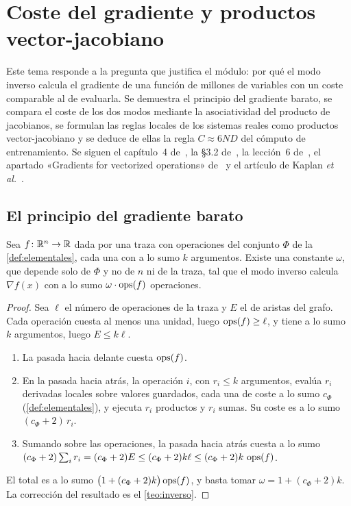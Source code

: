 \chapter{Coste del gradiente y productos vector-jacobiano}
\label{tema:4}

Este tema responde a la pregunta que justifica el módulo: por qué el modo inverso calcula el gradiente de una función de millones de variables con un coste comparable al de evaluarla. Se demuestra el principio del gradiente barato, se compara el coste de los dos modos mediante la asociatividad del producto de jacobianos, se formulan las reglas locales de los sistemas reales como productos vector-jacobiano y se deduce de ellas la regla $C\approx 6ND$ del cómputo de entrenamiento. Se siguen el capítulo~4 de~\cite{gw}, la §3.2 de~\cite{baydin}, la lección~6 de~\cite{grosse}, el apartado «Gradients for vectorized operations» de~\cite{cs231n} y el artículo de Kaplan \emph{et al.}~\cite{kaplan}.

\section{El principio del gradiente barato}

\begin{teorema}\label{teo:barato}
Sea $f\colon\mathbb{R}^{n}\to\mathbb{R}$ dada por una traza con operaciones del conjunto $\Phi$ de la \cref{def:elementales}, cada una con a lo sumo $k$ argumentos. Existe una constante $\omega$, que depende solo de $\Phi$ y no de $n$ ni de la traza, tal que el modo inverso calcula $\nabla f(x)$ con a lo sumo $\omega\cdot\operatorname{ops}(f)$ operaciones.
\end{teorema}

\begin{proof}
Sea $\ell$ el número de operaciones de la traza y $E$ el de aristas del grafo. Cada operación cuesta al menos una unidad, luego $\operatorname{ops}(f)\ge\ell$, y tiene a lo sumo $k$ argumentos, luego $E\le k\ell$.
\begin{enumerate}[label=\arabic*.]
  \item La pasada hacia delante cuesta $\operatorname{ops}(f)$.
  \item En la pasada hacia atrás, la operación $i$, con $r_i\le k$ argumentos, evalúa $r_i$ derivadas locales sobre valores guardados, cada una de coste a lo sumo $c_\Phi$ (\cref{def:elementales}), y ejecuta $r_i$ productos y $r_i$ sumas. Su coste es a lo sumo $(c_\Phi+2)\,r_i$.
  \item Sumando sobre las operaciones, la pasada hacia atrás cuesta a lo sumo $(c_\Phi+2)\sum_ir_i=(c_\Phi+2)E\le(c_\Phi+2)k\ell\le(c_\Phi+2)k\,\operatorname{ops}(f)$.
\end{enumerate}
El total es a lo sumo $\bigl(1+(c_\Phi+2)k\bigr)\operatorname{ops}(f)$, y basta tomar $\omega=1+(c_\Phi+2)k$. La corrección del resultado es el \cref{teo:inverso}.
\end{proof}

